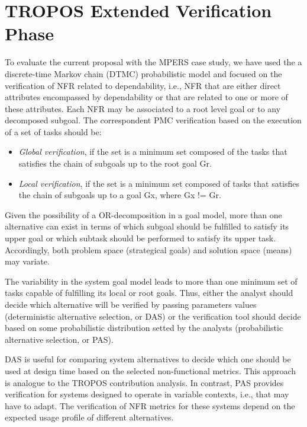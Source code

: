\section{TROPOS Extended Verification Phase}

To evaluate the current proposal with the MPERS case study, we have used the a discrete-time Markov chain (DTMC) probabilistic model and focused on the verification of NFR related to dependability, i.e., NFR that are either direct attributes encompassed by dependability or that are related to one or more of these attributes. Each NFR may be associated to a root level goal or to any decomposed subgoal. The correspondent PMC verification based on the execution of a set of tasks should be:

\begin{itemize}

\item \textit{Global verification}, if the set is a minimum set composed of the tasks that satisfies the chain of subgoals up to the root goal Gr.
\medskip

\item \textit{Local verification}, if the set is a minimum set composed of tasks that satisfies the chain of subgoals up to a goal Gx, where Gx != Gr.
\medskip

\end{itemize}

Given the possibility of a OR-decomposition in a goal model, more than one alternative can exist in terms of which subgoal should be fulfilled to satisfy its upper goal or which subtask should be performed to satisfy its upper task. Accordingly, both problem space (strategical goals) and solution space (means) may variate. 

The variability in the system goal model leads to more than one minimum set of tasks capable of fulfilling its local or root goals. Thus, either the analyst should decide which alternative will be verified by passing parameters values (deterministic alternative selection, or DAS) or the verification tool should decide based on some probabilistic distribution setted by the analysts (probabilistic alternative selection, or PAS).

DAS is useful for comparing system alternatives to decide which one should be used at design time based on the selected non-functional metrics. This approach is analogue to the TROPOS contribution analysis. In contrast, PAS provides verification for systems designed to operate in variable contexts, i.e., that may have to adapt. The verification of NFR metrics for these systems depend on the expected usage profile of different alternatives. 

